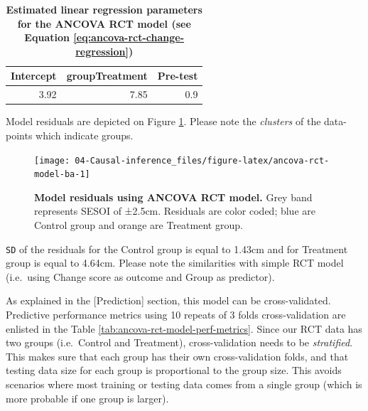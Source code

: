 \documentclass[
]{book}
\begin{document}
\begin{table}

\caption{\label{tab:ancova-rct-model-coef}\textbf{Estimated linear regression parameters for the ANCOVA RCT model (see Equation \eqref{eq:ancova-rct-change-regression})}}
\centering
\begin{tabular}[t]{rrr}
\toprule
Intercept & groupTreatment & Pre-test\\
\midrule
3.92 & 7.85 & 0.9\\
\bottomrule
\end{tabular}
\end{table}

Model residuals are depicted on Figure \ref{fig:ancova-rct-model-ba}. Please note the \emph{clusters} of the data-points which indicate groups.

\begin{figure}

{\centering \texttt{[image: 04-Causal-inference\_files/figure-latex/ancova-rct-model-ba-1]} 

}

\caption{\textbf{Model residuals using ANCOVA RCT model. }Grey band represents SESOI of ±2.5cm. Residuals are color coded; blue are Control group and orange are Treatment group.}\label{fig:ancova-rct-model-ba}
\end{figure}



\texttt{SD} of the residuals for the Control group is equal to 1.43cm and for Treatment group is equal to 4.64cm. Please note the similarities with simple RCT model (i.e.~using Change score as outcome and Group as predictor).

As explained in the {[}Prediction{]} section, this model can be cross-validated. Predictive performance metrics using 10 repeats of 3 folds cross-validation are enlisted in the Table \ref{tab:ancova-rct-model-perf-metrics}. Since our RCT data has two groups (i.e.~Control and Treatment), cross-validation needs to be \emph{stratified}. This makes sure that each group has their own cross-validation folds, and that testing data size for each group is proportional to the group size. This avoids scenarios where most training or testing data comes from a single group (which is more probable if one group is larger).
\end{document}
